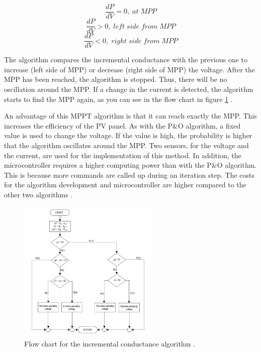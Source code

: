 \begin{equation} \label{Inccond1}
\frac{dP}{dV} = 0 ,\; at\; MPP 
\end{equation} 
\begin{equation} \label{Inccond2}
\frac{dP}{dV} > 0 ,\; left\; side\; from\; MPP 
\end{equation}
\begin{equation} \label{Inccond3}
\frac{dP}{dV} < 0 ,\; right\; side\; from\; MPP
\end{equation}

The algorithm compares the incremental conductance with the previous one to increase (left side of MPP) or decrease (right side of MPP) the voltage. After the MPP has been reached, the algorithm is stopped. Thus, there will be no oscillation around the MPP. If a change in the current is detected, the algorithm starts to find the MPP again, as you can see in the flow chart in figure \ref{fcinccon} \cite{AN1521_MC}.

An advantage of this MPPT algorithm is that it can reach exactly the MPP. This increases the efficiency of the PV panel. As with the P\&O algorithm, a fixed value is used to change the voltage. If the value is high, the probability is higher that the algorithm oscillates around the MPP. 
Two sensors, for the voltage and the current, are used for the implementation of this method. In addition, the microcontroller requires a higher computing power than with the P\&O algorithm. This is because more commands are called up during an iteration step. The costs for the algorithm development and microcontroller are higher compared to the other two algorithms \cite{AN1521_MC}.

\begin{figure}[H]
	\begin{center}
		\includegraphics[width=0.605\textwidth]{../Pictures/P1/Flow_chart/flow_chart_incremental_conductance}
		\caption{Flow chart for the incremental conductance algorithm \cite{AN1521_MC}.}
		\label{fcinccon}
	\end{center}	
\end{figure}

